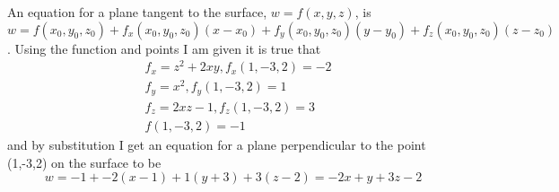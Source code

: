 \documentclass[titlepage]{article}
\begin{document}
\begin{solution}
An equation for a plane tangent to the surface, $w=f(x,y,z)$, is $w =f(x_0,y_0,z_0) + f_x(x_0,y_0,z_0)(x-x_0) + f_y(x_0,y_0,z_0)(y-y_0) +  f_z(x_0,y_0,z_0)(z-z_0)$. Using the function and points I am given it is true that
\begin{align*}
&f_x = z^2 + 2xy, f_x(1,-3,2) = -2\\
&f_y = x^2, f_y(1,-3,2) = 1\\
&f_z = 2xz-1, f_z(1,-3,2)  = 3\\
&f(1,-3,2) = -1
\end{align*}
and by substitution I get an equation for a plane perpendicular to the point (1,-3,2) on the surface to be
$$ w =-1 + -2(x-1) + 1(y+3) + 3(z-2) = -2x+y+3z-2$$
\end{solution}
\end{document}
